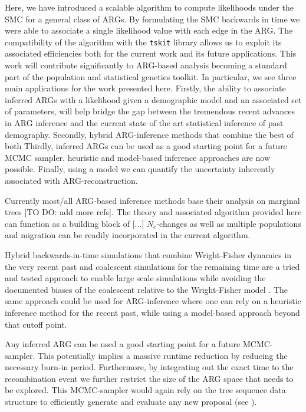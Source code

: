 \documentclass{article}
\begin{document}
Here, we have introduced a scalable algorithm to compute likelihoods
under the SMC for a general class of ARGs. By formulating the SMC backwards in time
we were able to associate a single likelihood value with each edge in the ARG.
The compatibility of the algorithm with the \texttt{tskit} library allows us to
exploit its associated efficiencies both for the current work and its future
applications. This work will contribute significantly
to ARG-based analysis becoming a standard part of the population
and statistical genetics toolkit.
In particular, we see three main applications for the work presented here.
Firstly, the ability to associate inferred ARGs with a likelihood given a demographic
model and an associated set of parameters, will help bridge the gap between the tremendous recent
advances in ARG inference and the current state of the art statistical inference of
past demography.
Secondly, hybrid ARG-inference methods that combine the best of both
Thirdly, inferred ARGs can be used as a good starting point for a future MCMC sampler.
heuristic and model-based inference approaches are now possible.
Finally, using a model we can quantify the uncertainty inherently associated
with ARG-reconstruction.

Currently most/all ARG-based inference methods base their analysis on marginal
trees \citep{hejase_summary_2020} [TO DO: add more refs]. The theory and associated algorithm
provided here can function as a building block of [...]
$N_e$-changes as well as multiple populations and migration can be readily incorporated
in the current algorithm.


Hybrid backwards-in-time simulations that combine Wright-Fisher dynamics in the
very recent past and coalescent simulations for the remaining time are a tried and tested
approach \citep{bhaskar_distortion_2014, nelson_accounting_2020} to enable large scale
simulations while avoiding the documented biases of the coalescent relative to the
Wright-Fisher model \citep{bhaskar_distortion_2014, wakeley_gene_2012}. The same approach
could be used for ARG-inference where one can rely on a heuristic inference method for
the recent past, while using a model-based approach beyond that cutoff point.

Any inferred ARG can be used a good starting point
for a future MCMC-sampler. This potentially implies a massive runtime reduction by
reducing the necessary burn-in period. Furthermore, by integrating out the exact time
to the recombination event we further restrict the size of the ARG space that needs to
be explored. This MCMC-sampler would again rely on the tree sequence data structure to
efficiently generate and evaluate any new proposal (see \citep{mahmoudi_bayesian_2022}).
\end{document}
